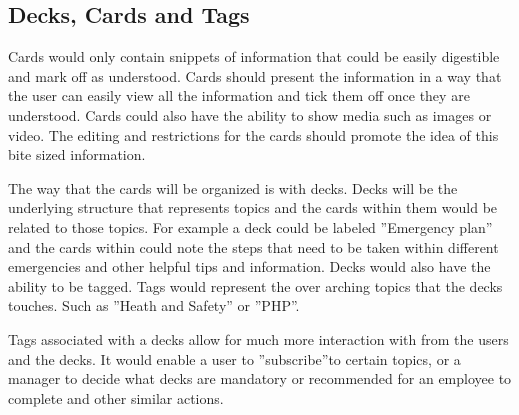 \subsection{Decks, Cards and Tags}
Cards would only contain snippets of information that could be easily digestible and mark off as understood. Cards should present the information in a way that the user can easily view all the information and tick them off once they are understood. Cards could also have the ability to show media such as images or video. The editing and restrictions for the cards should promote the idea of this bite sized information.

The way that the cards will be organized is with decks. Decks will be the underlying structure that represents topics and the cards within them would be related to those topics. For example a deck could be labeled ”Emergency plan” and the cards within could note the steps that need to be taken within different emergencies and other helpful tips and information.
Decks would also have the ability to be tagged. Tags would represent the over arching topics that the decks touches. Such as ”Heath and Safety” or ”PHP”.

Tags associated with a decks allow for much more interaction with from the users and the decks. It would enable a user to ”subscribe”to certain topics, or a manager to decide what decks are mandatory or recommended for an employee to complete and other similar actions.